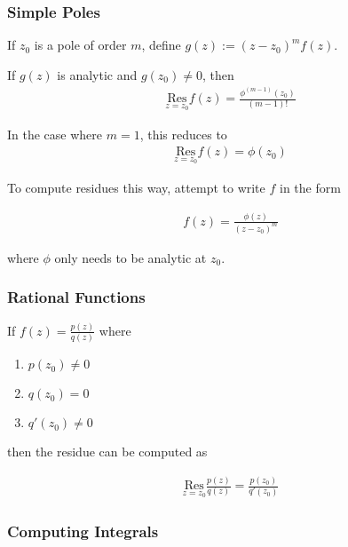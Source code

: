 \hypertarget{simple-poles}{%
\subsubsection{Simple Poles}\label{simple-poles}}

If \(z_0\) is a pole of order \(m\), define \(g(z) := (z-z_0)^m f(z)\).

{If \(g(z)\) is analytic and \(g(z_0) \neq 0\)}, then
\begin{align*}\underset{z=z_0}{\text{Res}} f(z) = \frac{\phi^{(m-1)}(z_0)}{(m-1)!}\end{align*}

In the case where \(m=1\), this reduces to
\begin{align*}\underset{z=z_0}{\text{Res}} f(z) = \phi(z_0)\end{align*}

To compute residues this way, attempt to write \(f\) in the form

\begin{align*}f(z) = \frac{\phi(z)}{(z-z_0)^m}\end{align*}

where \(\phi\) only needs to be analytic at \(z_0\).

\hypertarget{rational-functions}{%
\subsubsection{Rational Functions}\label{rational-functions}}

If \(f(z) = \frac{p(z)}{q(z)}\) where

\begin{enumerate}
\def\labelenumi{\arabic{enumi}.}
\item
  \(p(z_0) \neq 0\)
\item
  \(q(z_0) = 0\)
\item
  \(q'(z_0) \neq 0\)
\end{enumerate}

then the residue can be computed as

\begin{align*}\underset{z=z_0}{\text{Res}} \frac{p(z)}{q(z)} = \frac{p(z_0)}{q'(z_0)}\end{align*}

\hypertarget{computing-integrals-1}{%
\subsubsection{Computing Integrals}\label{computing-integrals-1}}

